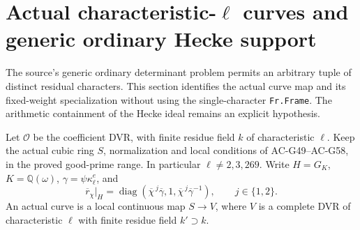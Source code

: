 \section{Actual characteristic-\(\ell\) curves and generic ordinary Hecke support}

The source's generic ordinary determinant problem permits an arbitrary
tuple of distinct residual characters.  This section identifies the
actual curve map and its fixed-weight specialization without using
the single-character \texttt{Fr.Frame}.  The arithmetic containment
of the Hecke ideal remains an explicit hypothesis.

Let \(\mathcal O\) be the coefficient DVR, with finite residue field
\(k\) of characteristic \(\ell\).  Keep the actual cubic ring
\(S\), normalization and local conditions of AC-G49--AC-G58, in the
proved good-prime range.  In particular \(\ell\ne2,3,269\).
Write \(H=G_K\), \(K=\mathbb Q(\omega)\),
\(\gamma=\psi\kappa_\ell^e\), and
\[
 \overline r_\chi|_H
   =\operatorname{diag}(\overline\chi^{\,j}\overline\gamma,
                       1,
                       \overline\chi^{\,j}\overline\gamma^{-1}),
 \qquad j\in\{1,2\}.
 \tag{G61.1}
\]
An actual curve is a local continuous map
\(S\longrightarrow V\), where \(V\) is a complete DVR of
characteristic \(\ell\) with finite residue field \(k'\supset k\).

